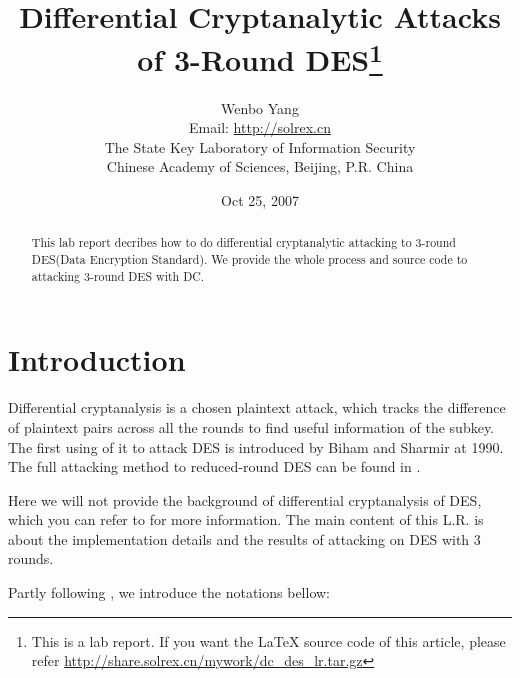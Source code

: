 \documentclass[a4paper,10pt]{article}
\begin{document}
\title{Differential Cryptanalytic Attacks of 3-Round DES\footnote{This is a lab report. If you want the \LaTeX{} source code of this article, please refer \url{http://share.solrex.cn/mywork/dc_des_lr.tar.gz}}}
\author{Wenbo Yang\\Email: \url{http://solrex.cn}\\The State Key Laboratory of Information Security\\Chinese Academy of Sciences, Beijing, P.R. China}
\date{Oct 25, 2007}
\maketitle

\setlength{\parskip}{1ex}

\begin{abstract}

This lab report decribes how to do differential cryptanalytic attacking to 3-round DES(Data Encryption Standard\cite{DES}). We provide the whole process and source code to attacking 3-round DES with DC.
 
\end{abstract}

\section{Introduction}

Differential cryptanalysis is a chosen plaintext attack, which tracks the difference of plaintext pairs across all the rounds to find useful information of the subkey. The first using of it to attack DES is introduced by Biham and Sharmir\cite{BIHA91} at 1990. The full attacking method to reduced-round DES can be found in \cite{BIHA93}.

Here we will not provide the background of differential cryptanalysis of DES, which you can refer to \cite{BIHA93} for more information. The main content of this L.R. is about the implementation details and the results of attacking on DES with 3 rounds.

Partly following \cite{BIHA91}, we introduce the notations bellow:
\end{document}
